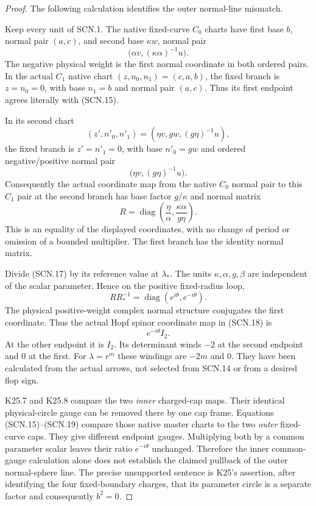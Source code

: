 \begin{proof}
The following calculation identifies the outer normal-line mismatch.

Keep every unit of SCN.1. The native fixed-curve \(C_0\) charts
have first base \(b\), normal pair \((a,c)\), and second base
\(\kappa w\), normal pair
\[
             \bigl(\alpha v,(\kappa\alpha)^{-1}u\bigr).
                                                        \tag{SCN.15}
\]
The negative physical weight is the first normal coordinate
in both ordered pairs. In the actual \(C_1\) native chart
\((z,n_0,n_1)=(c,a,b)\), the fixed branch is
\(z=n_0=0\), with base \(n_1=b\) and normal pair \((a,c)\).
Thus its first endpoint agrees literally with (SCN.15).

In its second chart
\[
              (z',n'_0,n'_1)
                   =(\eta v,g w,(g\eta)^{-1}u),
\]
the fixed branch is \(z'=n'_1=0\), with base \(n'_0=g w\)
and ordered negative/positive normal pair
\[
                    \bigl(\eta v,(g\eta)^{-1}u\bigr).
                                                        \tag{SCN.16}
\]
Consequently the actual coordinate map from the native
\(C_0\) normal pair to this \(C_1\) pair at the second branch
has base factor \(g/\kappa\) and normal matrix
\[
       R=\operatorname{diag}
          \left(\frac{\eta}{\alpha},
                       \frac{\kappa\alpha}{g\eta}\right).
                                                        \tag{SCN.17}
\]
This is an equality of the displayed coordinates, with no
change of period or omission of a bounded multiplier.
The first branch has the identity normal matrix.

Divide (SCN.17) by its reference value at \(\lambda_*\).
The units \(\kappa,\alpha,g,\beta\) are independent of the
scalar parameter. Hence on the positive fixed-radius loop,
\[
        R R_*^{-1}
           =\operatorname{diag}(e^{i\theta},e^{-i\theta}).
                                                        \tag{SCN.18}
\]
The physical positive-weight complex normal structure
conjugates the first coordinate. Thus the actual Hopf
spinor coordinate map in (SCN.18) is
\[
                         e^{-i\theta}I_2.             \tag{SCN.19}
\]
At the other endpoint it is \(I_2\). Its determinant winds
\(-2\) at the second endpoint and \(0\) at the first.
For \(\lambda=r^m\) these windings are \(-2m\) and \(0\).
They have been calculated from the actual arrows, not
selected from SCN.14 or from a desired flop sign.

K25.7 and K25.8 compare the two \emph{inner} charged-cap maps.
Their identical physical-circle gauge can be removed
there by one cap frame. Equations (SCN.15)--(SCN.19)
compare those native master charts to the two \emph{outer}
fixed-curve caps. They give different endpoint gauges.
Multiplying both by a common parameter scalar leaves
their ratio \(e^{-i\theta}\) unchanged. Therefore the
inner common-gauge calculation alone does not establish
the claimed pullback of the outer normal-sphere line.
The precise unsupported sentence is K25's assertion,
after identifying the four fixed-boundary charges,
that its parameter circle is a separate factor and
consequently \(b^2=0\).


\end{proof}
